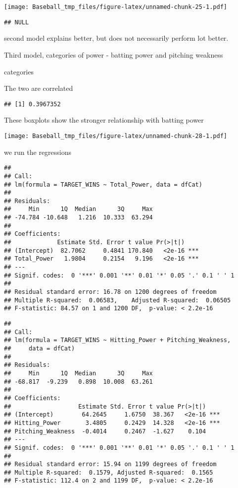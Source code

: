\documentclass[
]{article}
\begin{document}
\texttt{[image: Baseball\_tmp\_files/figure-latex/unnamed-chunk-25-1.pdf]}

\begin{verbatim}
## NULL
\end{verbatim}

second model explains better, but does not necessarily perform lot
better.

Third model, categories of power - batting power and pitching weakness

categories

The two are correlated

\begin{verbatim}
## [1] 0.3967352
\end{verbatim}

These boxplots show the stronger relationship with batting power

\texttt{[image: Baseball\_tmp\_files/figure-latex/unnamed-chunk-28-1.pdf]}

we run the regressions

\begin{verbatim}
## 
## Call:
## lm(formula = TARGET_WINS ~ Total_Power, data = dfCat)
## 
## Residuals:
##     Min      1Q  Median      3Q     Max 
## -74.784 -10.648   1.216  10.333  63.294 
## 
## Coefficients:
##             Estimate Std. Error t value Pr(>|t|)    
## (Intercept)  82.7062     0.4841 170.840   <2e-16 ***
## Total_Power   1.9804     0.2154   9.196   <2e-16 ***
## ---
## Signif. codes:  0 '***' 0.001 '**' 0.01 '*' 0.05 '.' 0.1 ' ' 1
## 
## Residual standard error: 16.78 on 1200 degrees of freedom
## Multiple R-squared:  0.06583,    Adjusted R-squared:  0.06505 
## F-statistic: 84.57 on 1 and 1200 DF,  p-value: < 2.2e-16
\end{verbatim}

\begin{verbatim}
## 
## Call:
## lm(formula = TARGET_WINS ~ Hitting_Power + Pitching_Weakness, 
##     data = dfCat)
## 
## Residuals:
##     Min      1Q  Median      3Q     Max 
## -68.817  -9.239   0.898  10.008  63.261 
## 
## Coefficients:
##                   Estimate Std. Error t value Pr(>|t|)    
## (Intercept)        64.2645     1.6750  38.367   <2e-16 ***
## Hitting_Power       3.4805     0.2429  14.328   <2e-16 ***
## Pitching_Weakness  -0.4014     0.2467  -1.627    0.104    
## ---
## Signif. codes:  0 '***' 0.001 '**' 0.01 '*' 0.05 '.' 0.1 ' ' 1
## 
## Residual standard error: 15.94 on 1199 degrees of freedom
## Multiple R-squared:  0.1579, Adjusted R-squared:  0.1565 
## F-statistic: 112.4 on 2 and 1199 DF,  p-value: < 2.2e-16
\end{verbatim}
\end{document}
